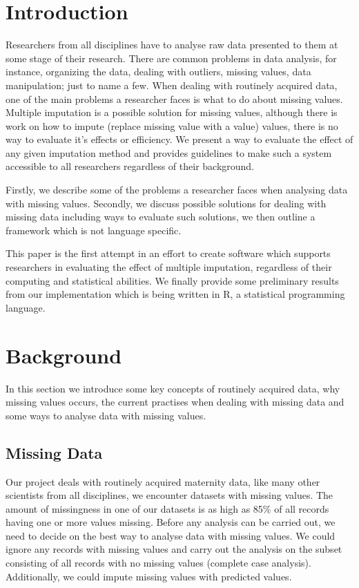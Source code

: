 \documentclass[conference,compsoc]{IEEEtran}
\begin{document}
	\section{Introduction} %
	\label{sec:introduction}
		Researchers from all disciplines have to analyse raw data presented to them at some stage of their research. There are common problems in data analysis, for instance, organizing the data, dealing with outliers, missing values, data manipulation; just to name a few. When dealing with routinely acquired data\cite{routine}, one of the main problems a researcher faces is what to do about missing values. Multiple imputation\cite{mi} is a possible solution for missing values, although there is work on how to impute (replace missing value with a value) values, there is no  way to evaluate it's effects or efficiency. We present a way to evaluate the effect of any given imputation method and provides guidelines to make such a system accessible to all researchers regardless of their background. 

		Firstly, we describe some of the problems a researcher faces when analysing data with missing values. Secondly, we discuss possible solutions for dealing with missing data including ways to evaluate such solutions, we then outline a framework which is not language specific.

		This paper is the first attempt in an effort to create software which supports researchers in evaluating the effect of multiple imputation, regardless of their computing and statistical abilities. We finally provide some preliminary results from our implementation which is being written in R, a statistical programming language. 

	\section{Background} %
	\label{sec:background}

	In this section we introduce some key concepts of routinely acquired data, why missing values occurs, the current practises when dealing with missing data and some ways to analyse data with missing values. 

		\subsection{Missing Data} %
		\label{sub:missing_data}
		Our project deals with routinely acquired maternity data, like many other scientists from all disciplines\cite{bigData}, we encounter datasets with missing values. The amount of missingness in one of our datasets is as high as 85\% of all records having one or more values missing. Before any analysis can be carried out, we need to decide on the best way to analyse data with missing values. We could ignore any records with missing values and carry out the analysis on the subset consisting of all records with no missing values (complete case analysis). Additionally, we could impute missing values with predicted values.
\end{document}
